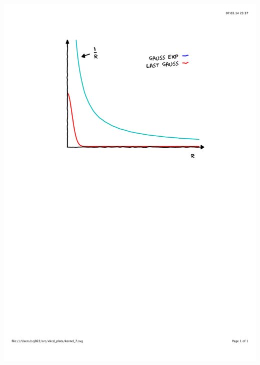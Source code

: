 \begin{frame}
\begin{columns}
\begin{column}{.45\textwidth}
{        \includegraphics[scale=0.4, clip, viewport = 110 450 490 800] {figures/kernel_7.pdf}
        \vspace{0mm}}
\end{column}
\end{columns}
\end{frame}

